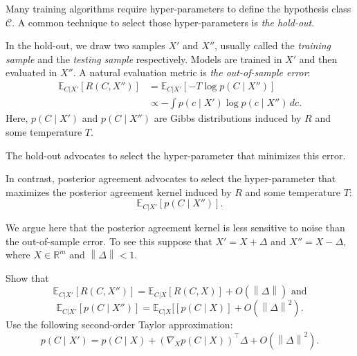 Many training algorithms require hyper-parameters to define the hypothesis class $\mathcal{C}$. A common technique to select those hyper-parameters is \emph{the hold-out}. 

In the hold-out, we draw two samples $X'$ and $X''$, usually called the \emph{training sample} and the \emph{testing sample} respectively. Models are trained in $X'$ and then evaluated in $X''$. A natural evaluation metric is \emph{the out-of-sample error}:
%
\begin{align}
\mathbb{E}_{C | X'}\left[R(C, X'')\right] &= \mathbb{E}_{C | X'}\left[- T \log p(C \mid X'')\right]\\ 
&\propto - \int p(c \mid X') \log p(c \mid X'') \, dc.
\end{align}
%
Here, $p(C \mid X')$ and $p(C \mid X'')$ are Gibbs distributions induced by $R$ and some temperature $T$.

The hold-out advocates to select the hyper-parameter that minimizes this error.

In contrast, posterior agreement advocates to select the hyper-parameter that maximizes the posterior agreement kernel induced by $R$ and some temperature $T$:
%
\begin{equation}
\mathbb{E}_{C | X'}\left[p(C \mid X'')\right].
\end{equation}

We argue here that the posterior agreement kernel is less sensitive to noise than the out-of-sample error. To see this suppose that $X' = X + \Delta$ and $X'' = X - \Delta$, where $X \in \mathbb{R}^m$ and $\left\|\Delta\right\| < 1$. 

\begin{exercise} Show that
%
\begin{equation}
\mathbb{E}_{C | X'}[R(C, X'')] = \mathbb{E}_{C | X}[R(C, X)] + O(\left\|\Delta\right\|) \text{ and}
\end{equation}
%
\begin{equation}
\mathbb{E}_{C | X'}[p(C \mid X'')] = \mathbb{E}_{C | X}[[p(C \mid X)] + O(\left\|\Delta\right\|^2).
\end{equation}
%
Use the following second-order Taylor approximation:
%
\begin{equation}
p(C \mid X') = p(C \mid X) + \left(\nabla_{X}p(C\mid X)\right)^\top \Delta + O(\left\|\Delta\right\|^2).
\end{equation}
%
\end{exercise}
%

